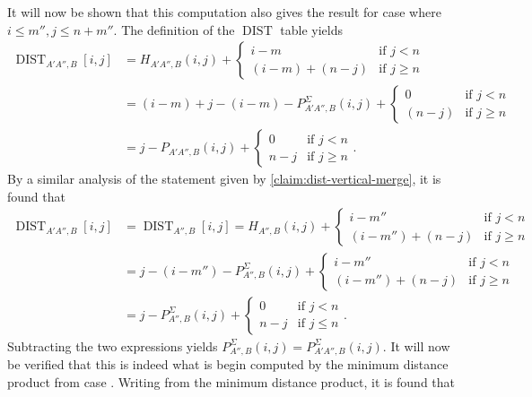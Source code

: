 \documentclass[twoside,11pt,openright]{report}
\newcommand{\DIST}{\operatorname{DIST}}
\newcommand*{\circled}[1]{\tikz[baseline=(char.base)]{
                          \node[shape=circle,draw,inner sep=2pt] (char) {#1};}}
\begin{document}
It will now be shown that this computation also gives the result for case \circled{1} where $i \leq m'', j \leq n + m''$. The definition of the $\DIST$ table yields
\begin{align*}
  \DIST_{A'A'',B}[i, j] &= H_{A'A'',B}(i, j) + \left\{
    \begin{array}{ll}
      i - m             & \text{if } j < n \\
      (i - m) + (n - j) & \text{if } j \geq n
    \end{array}
  \right. \\
  &= (i - m) + j - (i - m) - P_{A'A'',B}^\Sigma(i, j) + \left\{
    \begin{array}{ll}
      0             & \text{if } j < n \\
      (n - j)       & \text{if } j \geq n
    \end{array}
  \right. \\
  &= j - P_{A'A'',B}(i, j) + \left\{
    \begin{array}{ll}
      0             & \text{if } j < n \\
      n - j         & \text{if } j \geq n
    \end{array}
  \right. .
\end{align*}
By a similar analysis of the statement given by \cref{claim:dist-vertical-merge}, it is found that
\begin{align*}
  \DIST_{A'A'',B}[i, j] &= \DIST_{A'',B}[i, j] = H_{A'',B}(i, j) + \left\{
    \begin{array}{ll}
      i - m''             & \text{if } j < n \\
      (i - m'') + (n - j) & \text{if } j \geq n
    \end{array}
  \right. \\
  &= j - (i - m'') - P_{A'',B}^{\Sigma}(i, j) + \left\{
      \begin{array}{ll}
        i - m''             & \text{if } j < n \\
        (i - m'') + (n - j) & \text{if } j \geq n
      \end{array} \right. \\
  &= j - P_{A'',B}^{\Sigma}(i, j) + \left\{
    \begin{array}{ll}
      0             & \text{if } j < n \\
      n - j         & \text{if } j \leq n
    \end{array}
  \right. .
\end{align*}
Subtracting the two expressions yields $P_{A'',B}^{\Sigma}(i, j) = P_{A'A'',B}^{\Sigma}(i, j)$. It will now be verified that this is indeed what is begin computed by the minimum distance product from case \circled{3}. Writing from the minimum distance product, it is found that
\end{document}
